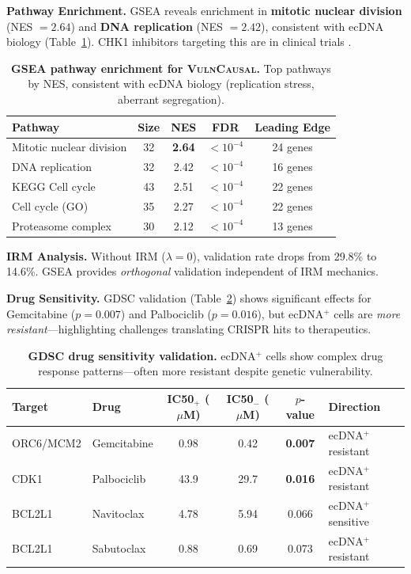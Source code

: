 \documentclass{article}
\newcommand{\vulncausal}{\textsc{VulnCausal}}
\begin{document}
\textbf{Pathway Enrichment.} GSEA \citep{subramanian_2005_gsea} reveals enrichment in \textbf{mitotic nuclear division} (NES $= 2.64$) and \textbf{DNA replication} (NES $= 2.42$), consistent with ecDNA biology (Table~\ref{tab:gsea}). CHK1 inhibitors targeting this are in clinical trials \citep{yi_2024_chk1_ecdna}.

\begin{table}[ht]
\caption{\textbf{GSEA pathway enrichment for \vulncausal{}.} Top pathways by NES, consistent with ecDNA biology (replication stress, aberrant segregation).}
\label{tab:gsea}
\centering
\small
\begin{tabular}{@{}lcccc@{}}
\toprule
Pathway & Size & NES & FDR & Leading Edge \\
\midrule
Mitotic nuclear division & 32 & \textbf{2.64} & $<10^{-4}$ & 24 genes \\
DNA replication & 32 & 2.42 & $<10^{-4}$ & 16 genes \\
KEGG Cell cycle & 43 & 2.51 & $<10^{-4}$ & 22 genes \\
Cell cycle (GO) & 35 & 2.27 & $<10^{-4}$ & 22 genes \\
Proteasome complex & 30 & 2.12 & $<10^{-4}$ & 13 genes \\
\bottomrule
\end{tabular}
\end{table}

\textbf{IRM Analysis.} Without IRM ($\lambda = 0$), validation rate drops from 29.8\% to 14.6\%. GSEA provides \textit{orthogonal} validation independent of IRM mechanics.

\textbf{Drug Sensitivity.} GDSC validation (Table~\ref{tab:gdsc_main}) shows significant effects for Gemcitabine ($p = 0.007$) and Palbociclib ($p = 0.016$), but ecDNA$^+$ cells are \textit{more resistant}---highlighting challenges translating CRISPR hits to therapeutics.

\begin{table}[ht]
\caption{\textbf{GDSC drug sensitivity validation.} ecDNA$^+$ cells show complex drug response patterns---often more resistant despite genetic vulnerability.}
\label{tab:gdsc_main}
\centering
\small
\begin{tabular}{@{}llcccl@{}}
\toprule
Target & Drug & IC50$_{+}$ ($\mu$M) & IC50$_{-}$ ($\mu$M) & $p$-value & Direction \\
\midrule
ORC6/MCM2 & Gemcitabine & 0.98 & 0.42 & \textbf{0.007} & ecDNA$^+$ resistant \\
CDK1 & Palbociclib & 43.9 & 29.7 & \textbf{0.016} & ecDNA$^+$ resistant \\
BCL2L1 & Navitoclax & 4.78 & 5.94 & 0.066 & ecDNA$^+$ sensitive \\
BCL2L1 & Sabutoclax & 0.88 & 0.69 & 0.073 & ecDNA$^+$ resistant \\
\bottomrule
\end{tabular}
\end{table}
\end{document}
